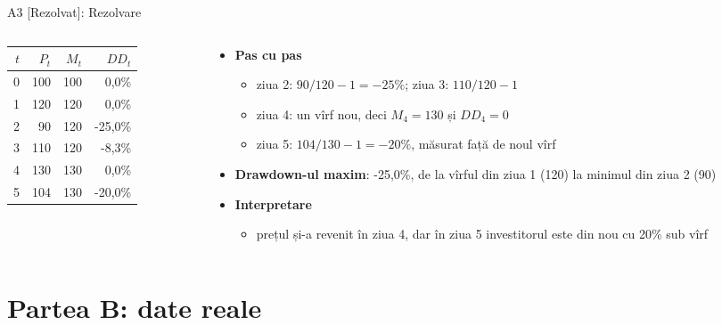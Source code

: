 \begin{frame}{A3 [Rezolvat]: Rezolvare}
\itemsize{\small}
\begin{columns}[T]
\begin{column}{0.38\textwidth}
\begin{center}
\footnotesize
\begin{tabular}{rrrr}
\toprule
$t$ & $P_t$ & $M_t$ & $DD_t$ \\
\midrule
0 & 100 & 100 & 0{,}0\% \\
1 & 120 & 120 & 0{,}0\% \\
2 & 90 & 120 & -25{,}0\% \\
3 & 110 & 120 & -8{,}3\% \\
4 & 130 & 130 & 0{,}0\% \\
5 & 104 & 130 & -20{,}0\% \\
\bottomrule
\end{tabular}
\end{center}

\end{column}
\begin{column}{0.58\textwidth}
\begin{itemize}
    \item \textbf{Pas cu pas}
    \begin{itemize}
        \item ziua 2: $90/120 - 1 = -25\%$; ziua 3: $110/120 - 1$
        \item ziua 4: un vîrf nou, deci $M_4 = 130$ și $DD_4 = 0$
        \item ziua 5: $104/130 - 1 = -20\%$, măsurat față de noul vîrf
    \end{itemize}
    \item \textbf{Drawdown-ul maxim}: -25{,}0\%, de la vîrful din ziua 1 (120) la minimul din ziua 2 (90)
    \item \textbf{Interpretare}
    \begin{itemize}
        \item prețul și-a revenit în ziua 4, dar în ziua 5 investitorul este din nou cu 20\% sub vîrf
    \end{itemize}
\end{itemize}
\end{column}
\end{columns}
\end{frame}


\section{Partea B: date reale}


